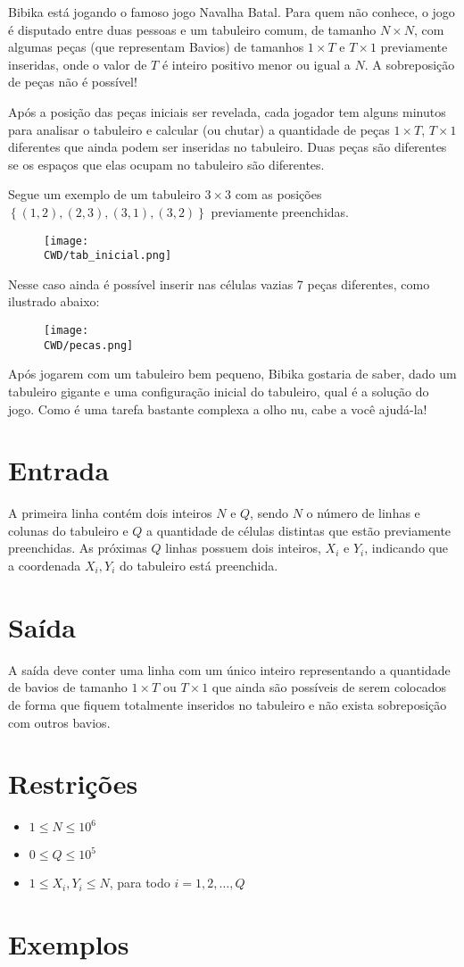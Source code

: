 Bibika está jogando o famoso jogo Navalha Batal.
Para quem não conhece, o jogo é disputado entre duas pessoas e um tabuleiro comum, de tamanho $N \times N$, com algumas peças (que representam Bavios) de tamanhos $1 \times T$ e $T \times 1$ previamente inseridas, onde o valor de $T$ é inteiro positivo menor ou igual a $N$.
A sobreposição de peças não é possível!

Após a posição das peças iniciais ser revelada, cada jogador tem alguns minutos para analisar o tabuleiro e calcular (ou chutar) a quantidade de peças $1 \times T$, $T \times 1$ diferentes que ainda podem ser inseridas no tabuleiro.
Duas peças são diferentes se os espaços que elas ocupam no tabuleiro são diferentes.

Segue um exemplo de um tabuleiro $3 \times 3$ com as posições $\left\{(1,2), (2,3), (3,1), (3,2)\right\}$ previamente preenchidas.

\begin{figure}[h!]
\centering
\texttt{[image: \\CWD/tab\_inicial.png]}
\end{figure}

Nesse caso ainda é possível inserir nas células vazias 7 peças diferentes, como ilustrado abaixo:

\begin{figure}[h!]
\centering
\texttt{[image: \\CWD/pecas.png]}
\end{figure}

Após jogarem com um tabuleiro bem pequeno, Bibika gostaria de saber, dado um tabuleiro gigante e uma configuração inicial do tabuleiro, qual é a solução do jogo. Como é uma tarefa bastante complexa a olho nu, cabe a você ajudá-la!

\section*{Entrada}

A primeira linha contém dois inteiros $N$ e $Q$, sendo $N$ o número de linhas e colunas do tabuleiro e $Q$ a quantidade de células distintas que estão previamente preenchidas.
As próximas $Q$ linhas possuem dois inteiros, $X_i$ e $Y_i$, indicando que a coordenada $X_i, Y_i$ do tabuleiro está preenchida.

\section*{Saída}

A saída deve conter uma linha com um único inteiro representando a quantidade de bavios de tamanho $1 \times T$ ou $T \times 1$ que ainda são possíveis de serem colocados de forma que fiquem totalmente inseridos no tabuleiro e não exista sobreposição com outros bavios.

\section*{Restrições}

\begin{itemize}
\item $1 \leq N \leq 10^6$
\item $0 \leq Q \leq 10^5$
\item $1 \leq X_i, Y_i \leq N$, para todo $i = 1,2,\ldots,Q$
\end{itemize}

\section*{Exemplos}
\exemplo
